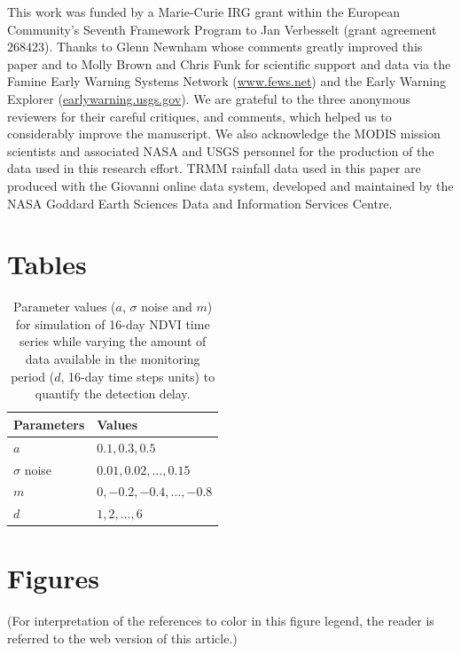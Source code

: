 \documentclass[authoryear,preprint,review,10pt]{elsarticle}
\begin{document}
This work was funded by a Marie-Curie IRG grant within the European Community's Seventh Framework Program to Jan Verbesselt (grant agreement $268423$). Thanks to Glenn Newnham whose comments greatly improved this paper and to Molly Brown and Chris Funk for scientific support and data via the Famine Early Warning Systems Network (\url{www.fews.net}) and the Early Warning Explorer (\url{earlywarning.usgs.gov}). We are grateful to the three anonymous reviewers for their careful critiques, and comments, which helped us to considerably improve the manuscript. We also acknowledge the MODIS mission scientists and associated NASA and USGS personnel for the production of the data used in this research effort. TRMM rainfall data used in this paper are produced with the Giovanni online data system, developed and maintained by the NASA Goddard Earth Sciences Data and Information Services Centre.



\newpage

\section*{Tables}

\begin{table}[htb]
\caption{Parameter values ($a$, $\sigma$ noise and $m$) for simulation of 16-day NDVI time series while varying the amount of data available in the monitoring period ($d$, 16-day time steps units) to quantify the detection delay.}
\centering
\begin{tabular}{ll}
  \hline
  Parameters & Values \\ [0.5ex]
  \hline
  $a$         & $0.1, 0.3, 0.5$ \\
  $\sigma$ noise    & $0.01,0.02,\dots,0.15$ \\
  $m$         & $0, -0.2, -0.4, \dots, -0.8$ \\
  $d$   & $1, 2, \dots, 6$ \\ [.5ex]
  \hline
\end{tabular}
\label{table:simpar}
\end{table}

\newpage

\section*{Figures}

 (For interpretation of the references to color in this figure legend, the reader is referred to the web
 version of this article.)
\end{document}

